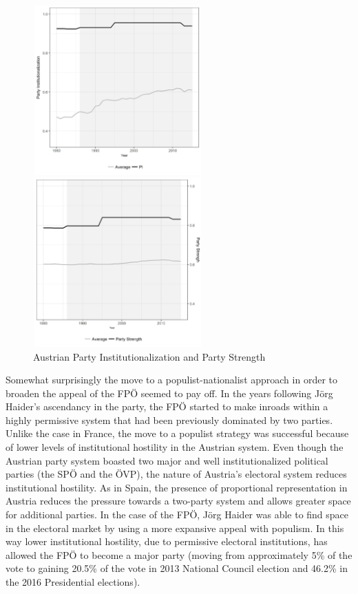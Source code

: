 \documentclass[a4paper,12pt]{article}\usepackage[]{graphicx}\usepackage[]{color}
\begin{document}
\begin{figure}[H]%
\centering
\parbox{2.5in}{\includegraphics[width=65mm, height=65mm]{austria1.jpg}}%
\qquad
\begin{minipage}{2in}%
\includegraphics[width=65mm, height=65mm]{austria2.jpg}
\end{minipage}%
\caption{Austrian Party Institutionalization and Party Strength}%
\label{austriapsi}%
\end{figure}
\par
Somewhat surprisingly the move to a populist-nationalist approach in order to broaden the appeal of the FP\"{O} seemed to pay off. In the years following J\"{o}rg Haider's ascendancy in the party, the FP\"{O} started to make inroads within a highly permissive system that had been previously dominated by two parties. Unlike the case in France, the move to a populist strategy was successful because of lower levels of institutional hostility in the Austrian system. Even though the Austrian party system boasted two major and well institutionalized political parties (the SP\"{O} and the \"{O}VP), the nature of Austria's electoral system reduces institutional hostility. As in Spain, the presence of proportional representation in Austria reduces the pressure towards a two-party system and allows greater space for additional parties. In the case of the FP\"{O}, J\"{o}rg Haider was able to find space in the electoral market by using a more expansive appeal with populism. In this way lower institutional hostility, due to permissive electoral institutions, has allowed the FP\"{O} to become a major party (moving from approximately 5\% of the vote to gaining 20.5\% of the vote in 2013 National Council election and 46.2\% in the 2016 Presidential elections). 
\end{document}
